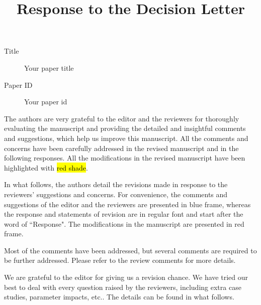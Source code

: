 \documentclass{response}
\renewcommand{\papertitle}{Your paper title}
\renewcommand{\paperid}{Your paper id}
\begin{document}
\title{Response to the Decision Letter}
\author{}
\date{}
\maketitle


\begin{description}
    \item[Title] \large \papertitle
    \item[Paper ID] \large \paperid
\end{description}

\begin{R2ER}
The authors are very grateful to the editor and the reviewers for thoroughly evaluating the manuscript and providing the detailed and insightful comments and suggestions, which help us improve this manuscript. All the comments and concerns have been carefully addressed in the revised manuscript and in the following responses. All the modifications in the revised manuscript have been highlighted with \hl{red shade}.

In what follows, the authors detail the revisions made in response to the reviewers' suggestions and concerns. For convenience, the comments and suggestions of the editor and the reviewers are presented in blue frame, whereas the response and statements of revision are in regular font and start after the word of “Response". The modifications in the manuscript are presented in red frame.
\end{R2ER}

\tableofcontents

\newpage
{}
\setcounter{page}{1}

\begin{R2E}
    \begin{Comment}
    Most of the comments have been addressed, but several comments are required to be further addressed. Please refer to the review comments for more details.
    \end{Comment}
    \begin{Response}
    We are grateful to the editor for giving us a  revision chance. We have tried our best to deal with every question raised by the reviewers, including extra case studies, parameter impacts, etc.. The details can be found in what follows.
    \end{Response}
\end{R2E}
\clearpage
\end{document}
